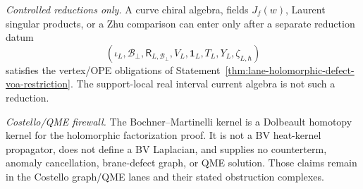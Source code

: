 \begin{stmt}
  \emph{Controlled reductions only.} A curve chiral algebra, fields
  \(J_f(w)\), Laurent singular products, or a Zhu comparison can enter
  only after a separate reduction datum
  \[
    (\iota_L,\mathcal B_\perp,\mathsf R_{L,\mathcal B_\perp},
    V_L,\mathbf 1_L,T_L,Y_L,\zeta_{L,\hbar})
  \]
  satisfies the vertex/OPE obligations of
  Statement~\ref{thm:lane-holomorphic-defect-voa-restriction}.  The
  support-local real interval current algebra is not such a reduction.

  \emph{Costello/QME firewall.} The Bochner--Martinelli kernel is a
  Dolbeault homotopy kernel for the holomorphic factorization proof.  It
  is not a BV heat-kernel propagator, does not define a BV Laplacian, and
  supplies no counterterm, anomaly cancellation, brane-defect graph, or
  QME solution.  Those claims remain in the Costello graph/QME lanes and
  their stated obstruction complexes.
\end{stmt}

